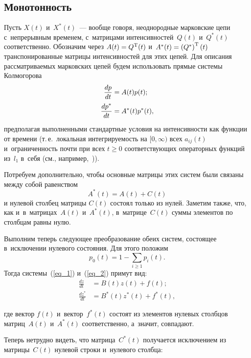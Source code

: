 \begin{multicols}{2}
\section{Монотонность }

Пусть $X(t)$ и~$X^*(t)$~--- вообще говоря, неоднородные  марковские цепи 
с~непрерывным временем, с~матрицами интенсивностей~$Q(t)$ и~$Q^*(t)$ 
соответственно. Обозначим через $A(t) \hm= Q^{\mathrm{T}}(t)$  и~$A^*(t) \hm= \left(
 Q^*\right)^{\mathrm{T}}(t)$ транспонированные матрицы  интенсивностей для этих цепей. Для 
описания рассматриваемых марковских цепей будем использовать прямые системы 
Колмогорова
\begin{align}
\label{eq_1}
\displaystyle\frac{\displaystyle dp\mathstrut}{\displaystyle dt\mathstrut}&=A(t)p(t);
\\
\label{eq_2}
\displaystyle\frac{\displaystyle dp^*\mathstrut}{\displaystyle dt\mathstrut}&=A^*(t)p^*(t),
 \end{align}
\noindent предполагая выполненными стандартные условия на интенсивности как 
функции от времени (т.\,е.\ локальная интегрируемость на $[0,\infty)$ всех 
$a_{ij}(t)$ и~ограниченность почти при всех $t \ge 0$ соответствующих 
операторных функций из~$l_1$ в~себя (см., например,~\cite{Zeifman})).

Потребуем дополнительно, чтобы  основные мат\-ри\-цы этих сис\-тем были связаны между 
собой равенством
\begin{equation*}
A^*(t) = A(t)+C(t)
\end{equation*}
и нулевой столбец матрицы $C\left(t\right)$ состоял только из нулей. 
Заметим также, что, как и~в~матрицах~$A\left( t\right)$ и~$A^*\left( t\right)$, 
в~матрице~$C\left(t\right)$ суммы элементов по столбцам равны нулю.

Выполним теперь следующее преобразование обеих систем, состоящее в~исключении 
нулевого состояния. Для этого положим
$$
p_0\left( t\right) =1-\sum\limits_{i\geq 1}p_i\left( t\right).
$$
Тогда системы~(\ref{eq_1}) и~(\ref{eq_2}) примут вид:
\begin{align}
\label{eq_4}
\frac{dz}{dt}&=B(t)z(t)+f(t);
\\
\label{eq_5}
\frac{dz^*}{dt}&=B^*(t)z^*(t)+f^*(t),
\end{align}

\noindent 
где вектор $f(t)$ и~вектор~$f^*(t)$ состоят из элементов нулевых 
столбцов мат\-риц~$A\left( t\right)$ и~$A^*\left( t\right)$ соответственно, 
а~значит, совпадают.


Теперь нетрудно видеть, что матрица~$C^*\left( t\right)$ получается исключением  
из матрицы~$C\left( t\right)$ нулевой строки и~нулевого столбца:


\end{multicols}
